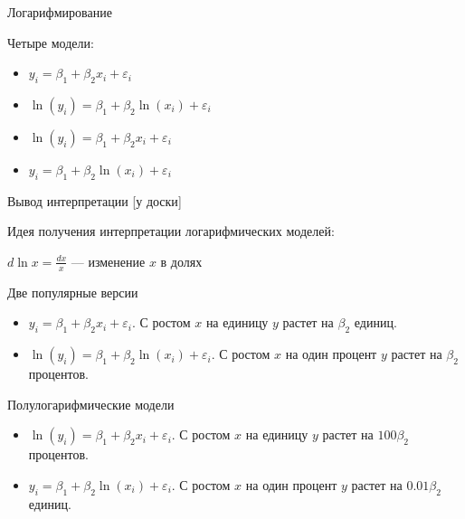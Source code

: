 \documentclass[ignorenonframetext,]{beamer}
\begin{document}
\begin{frame}{Логарифмирование}

Четыре модели:

\begin{itemize}
\item
  \(y_i = \beta_1 + \beta_2 x_i + \varepsilon_i\)
\item
  \(\ln( y_i) = \beta_1 + \beta_2 \ln( x_i) + \varepsilon_i\)
\item
  \(\ln( y_i) = \beta_1 + \beta_2 x_i + \varepsilon_i\)
\item
  \(y_i = \beta_1 + \beta_2 \ln( x_i) + \varepsilon_i\)
\end{itemize}

\end{frame}

\begin{frame}{Вывод интерпретации {[}у доски{]}}

Идея получения интерпретации логарифмических моделей:

\(d \ln x= \frac{dx}{x}\) --- изменение \(x\) в долях

\end{frame}

\begin{frame}{Две популярные версии}

\begin{itemize}
\item
  \(y_i = \beta_1 + \beta_2 x_i + \varepsilon_i\). С ростом \(x\) на
  единицу \(y\) растет на \(\beta_2\) единиц.
\item
  \(\ln( y_i) = \beta_1 + \beta_2 \ln( x_i) + \varepsilon_i\). С ростом
  \(x\) на один процент \(y\) растет на \(\beta_2\) процентов.
\end{itemize}

\end{frame}

\begin{frame}{Полулогарифмические модели}

\begin{itemize}
\item
  \(\ln( y_i) = \beta_1 + \beta_2 x_i + \varepsilon_i\). С ростом \(x\)
  на единицу \(y\) растет на \(100\beta_2\) процентов.
\item
  \(y_i = \beta_1 + \beta_2 \ln( x_i) + \varepsilon_i\). С ростом \(x\)
  на один процент \(y\) растет на \(0.01\beta_2\) единиц.
\end{itemize}

\end{frame}
\end{document}
